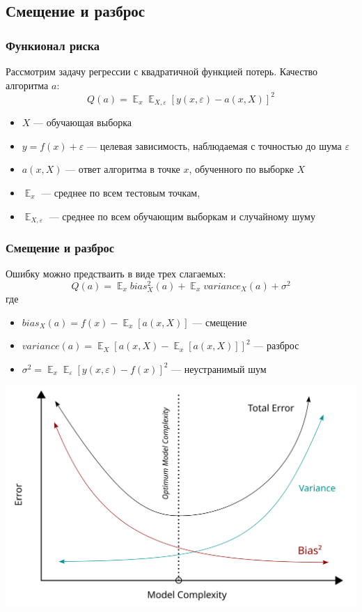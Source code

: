 \documentclass{beamer}
\newcommand{\eps}{\varepsilon}
\DeclareMathOperator{\E}{\mathbb{E}}
\begin{document}
	\subsection{Смещение и разброс}

	\begin{frame}
		\frametitle{Функионал риска}
		Рассмотрим задачу регрессии с квадратичной функцией потерь. Качество алгоритма $a$:
		\[
		Q(a) = \E_x \E_{X, \eps} [y(x, \eps) - a(x, X)]^{2}
		\]

		\begin{itemize}
			\item $X$ --- обучающая выборка
			\item $y = f(x) + \eps$ --- целевая зависимость, наблюдаемая с точностью до шума $\eps$
			\item $a(x, X)$ --- ответ алгоритма в точке $x$, обученного по выборке $X$
			\item $\E_x$ --- среднее по всем тестовым точкам, 
			\item $\E_{X, \eps}$ --- среднее по всем обучающим выборкам и случайному шуму
		\end{itemize}
	\end{frame}

	\begin{frame}
		\frametitle{Смещение и разброс}
		
		Ошибку можно предстваить в виде трех слагаемых:
		\[
		Q(a) = \E_x bias_X^2 (a) + 
		\E_x variance_X (a)
		+ \sigma^2
		\]
		где
		\begin{itemize}
			\item $bias_X(a) = f(x) - \E_x [a(x, X)]$ --- смещение
			\item $variance(a) = \E_X [ a(x, X) - \E_x[a(x, X)] ]^2$ --- разброс
			\item $\sigma^2 = \E_x \E_{\eps} [y(x, \eps) - f(x)]^2$ --- неустранимый шум
		\end{itemize}
	\end{frame}

	\begin{frame}
		\includegraphics[width=1\textwidth]{img/bias_variance_tradeoff.png}	
	\end{frame}
\end{document}
